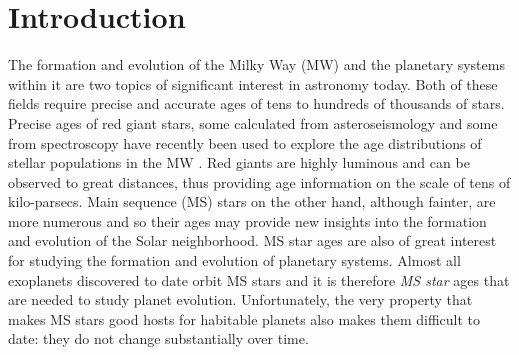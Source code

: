 \section{Introduction}
\label{section:intro}


The formation and evolution of the Milky Way (MW) and the planetary systems
within it are two topics of significant interest in astronomy today.
Both of these fields require precise and accurate ages of tens to hundreds of
thousands of stars.
Precise ages of red giant stars, some calculated from asteroseismology and
some from spectroscopy have recently been used to explore the age
distributions of stellar populations in the MW
.
Red giants are highly luminous and can be observed to great distances, thus
providing age information on the scale of tens of kilo-parsecs.
Main sequence (MS) stars on the other hand, although fainter, are more
numerous and so their ages may provide new insights into the formation and
evolution of the Solar neighborhood.
MS star ages are also of great interest for studying the formation and
evolution of planetary systems.
Almost all exoplanets discovered to date orbit MS stars and it is therefore
{\it MS star} ages that are needed to study planet evolution.
Unfortunately, the very property that makes MS stars good hosts for habitable
planets also makes them difficult to date: they do not change substantially
over time.

